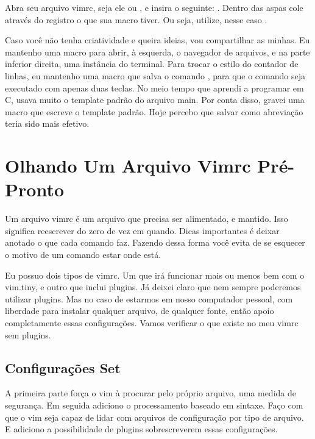 Abra seu arquivo vimrc, seja ele  ou , e insira o seguinte:
.
Dentro das aspas cole através do registro o que sua macro tiver.
Ou seja, utilize, nesse caso .

Caso você não tenha criatividade e queira ideias, vou compartilhar as minhas.
Eu mantenho uma macro para abrir, à esquerda,
o navegador de arquivos, e na parte inferior direita, uma instância do terminal.
Para trocar o estilo do contador de linhas, eu mantenho uma macro que salva o comando
, para que o comando seja executado com apenas duas teclas.
No meio tempo que aprendi a programar em C, usava muito o template padrão do arquivo main.
Por conta disso, gravei uma macro que escreve o template padrão.
Hoje percebo que salvar como abreviação teria sido mais efetivo.


\section{Olhando Um Arquivo Vimrc Pré-Pronto}
Um arquivo vimrc é um arquivo que precisa ser alimentado, e mantido.
Isso significa reescrever do zero de vez em quando.
Dicas importantes é deixar anotado o que cada comando faz.
Fazendo dessa forma você evita de se esquecer o motivo de um comando estar onde está.

Eu possuo dois tipos de vimrc.
Um que irá funcionar mais ou menos bem com o vim.tiny, e outro que inclui plugins.
Já deixei claro que nem sempre poderemos utilizar plugins.
Mas no caso de estarmos em nosso computador pessoal, com liberdade para instalar qualquer arquivo,
de qualquer fonte, então apoio completamente essas configurações.
Vamos verificar o que existe no meu vimrc sem plugins.


\subsection{Configurações Set}

A primeira parte força o vim à procurar pelo próprio arquivo,
uma medida de segurança.
Em seguida adiciono o processamento baseado em sintaxe.
Faço com que o vim seja capaz de lidar com arquivos de configuração por tipo de arquivo.
E adiciono a possibilidade de plugins sobrescreverem essas configurações.

